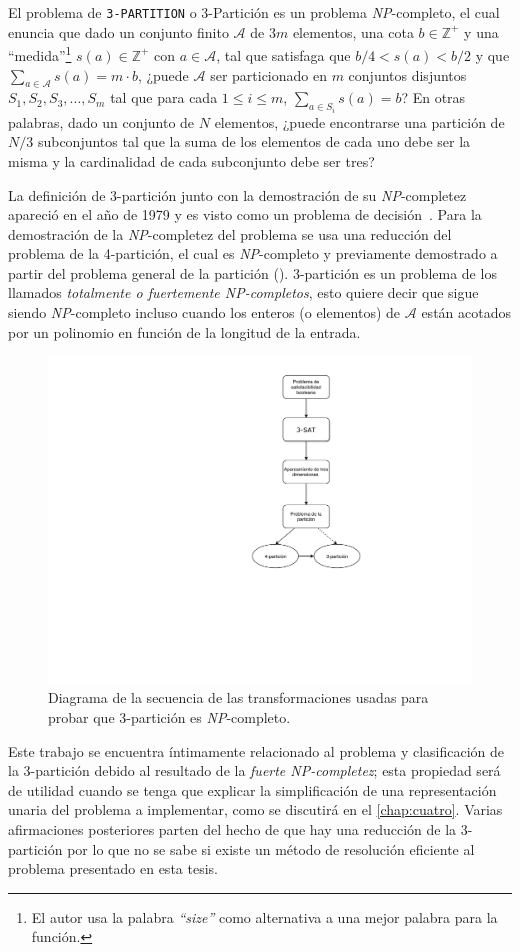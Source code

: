 El problema de \texttt{3-PARTITION} o 3-Partición es un problema \textsl{NP}-completo,
el cual enuncia que dado un conjunto finito $\mathcal{A}$ de $3m$ elementos,
una cota $b \in \mathds{Z}^{+}$ y una ``medida''\footnote{El autor usa la
palabra \textit{``size''} como alternativa a una mejor palabra para la función.}
$s(a) \in \mathds{Z}^{+}$ con $a \in \mathcal{A}$, tal que
satisfaga que $b/4 < s(a) < b/2$ y que $\sum_{a \in \mathcal{A}} s(a) = m \cdot b$,
¿puede $\mathcal{A}$ ser particionado en $m$ conjuntos disjuntos $S_{1}, S_{2},
S_{3}, \ldots , S_{m}$ tal que para cada $1 \leq i \leq m $, $\sum_{a \in S_{i}}
s(a)=b$? En otras palabras, dado un conjunto de $N$ elementos,
¿puede encontrarse una partición de $N/3$ subconjuntos tal que la suma de los
elementos de cada uno debe ser la misma y la cardinalidad de cada subconjunto
debe ser tres?

La definición de 3-partición junto con la demostración
de su \mbox{\textsl{NP}-completez} apareció en el año de 1979 y es visto como
un problema de decisión~\cite{Garey:1990:CIG:574848}. Para la demostración de la
\textsl{NP}-completez del problema se usa una reducción del problema de la
4-partición, el cual es \textsl{NP}-completo y previamente demostrado a partir
del problema general de la partición
(). 3-partición es un problema de los llamados
\textit{totalmente o fuertemente \textsl{NP}-completos}, esto quiere decir que
sigue siendo \textsl{NP}-completo incluso cuando los enteros (o elementos) de
$\mathcal{A}$ están acotados por un polinomio en función de la longitud de la entrada.

\begin{figure}[h]
\centering
\includegraphics[width=.45\textwidth,keepaspectratio,trim={12cm 6cm 7cm 0cm}]{./images/2_2_1.pdf}
\caption{Diagrama de la secuencia de las transformaciones usadas para
probar que 3-partición es \textsl{NP}-completo.}
\label{fig:secuenciaNP}
\end{figure}

Este trabajo se encuentra íntimamente relacionado al problema y clasificación de
la 3-partición debido al resultado de la \textit{fuerte \textsl{NP}-completez};
esta propiedad será de utilidad cuando se tenga que explicar la simplificación de
una representación unaria del problema a implementar, como se discutirá en el
\cref{chap:cuatro}. Varias afirmaciones posteriores parten del hecho de que
hay una reducción de la 3-partición por lo que no se sabe si existe un método de
resolución eficiente al problema presentado en esta tesis.

